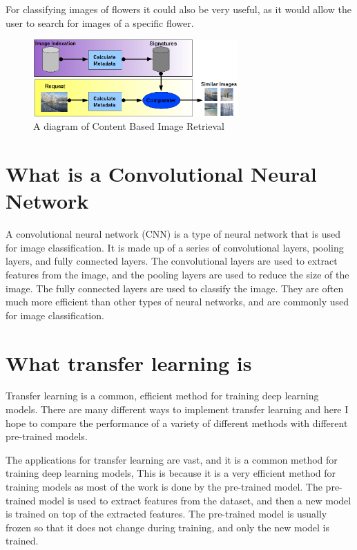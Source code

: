 \documentclass[]{final_report}
\begin{document}
For classifying images of flowers it could also be very useful, as it would allow the user to search for images of a specific flower.

\begin{figure}[h]
  \centering
  \includegraphics[width=0.7\textwidth]{images/Principe_cbir.png}
  \caption{A diagram of Content Based Image Retrieval \cite{ContentBasedImageRetrieval}}
\end{figure}


\section{What is a Convolutional Neural Network}
A convolutional neural network (CNN) is a type of neural network that is used for image classification.
It is made up of a series of convolutional layers, pooling layers, and fully connected layers.
The convolutional layers are used to extract features from the image, and the pooling layers are used to reduce the size of the image.
The fully connected layers are used to classify the image.
They are often much more efficient than other types of neural networks, and are commonly used for image classification.



\section{What transfer learning is}
Transfer learning is a common, efficient method for training deep learning models.
There are many different ways to implement transfer learning and here I hope to compare the performance
of a variety of different methods with different pre-trained models.

The applications for transfer learning are vast, and it is a common method for training deep learning models,
This is because it is a very efficient method for training models as most of the work is done by the pre-trained model.
The pre-trained model is used to extract features from the dataset, and then a new model is trained on top of the extracted features.
The pre-trained model is usually frozen so that it does not change during training, and only the new model is trained.
\end{document}
